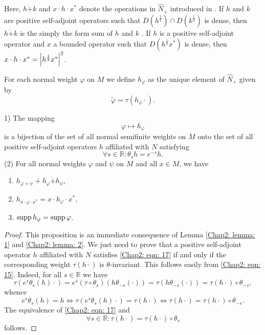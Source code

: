 Here, $h\dot{+}k$ and $x\cdot h\cdot x^*$ denote the operations in $\hat{N}_+$ introduced in \cite[Definition 1.3]{7}. If $h$ and $k$ are positive self-adjoint operators such that $D(h^\frac{1}{2})\cap D(k^\frac{1}{2})$ is dense, then $h\dot{+}k$ is the simply the form sum of $h$ and $k$ \cite[Corollary 4.13]{2}. If $h$ is a positive self-adjoint operator and $x$ a bounded operator such that $D(h^\frac{1}{2}x^*)$ is dense, then $x\cdot h\cdot x^*=\abs{h^\frac{1}{2}x^*}^2$.\par
\begin{definition}
    For each normal weight $\varphi$ on $M$ we define $h_\varphi$ as the unique element of $\hat{N}_+$ given by
    \begin{equation}
        \tilde{\varphi}=\tau(h_\varphi\cdot).
    \end{equation}
\end{definition}
\begin{proposition}\label{Chap2: Prop: 4}
    1) The mapping
    \[
        \varphi\mapsto h_\varphi
    \]
    is a bijection of the set of all normal semifinite weights on $M$ onto the set of all positive self-adjoint operators $h$ affiliated with $N$ satisfying
    \begin{equation}\label{Chap2: eqn: 17}
        \forall s\in \mathbb{R}:\theta_sh=e^{-s}h.
    \end{equation}
    (2) For all normal weights $\varphi$ and $\psi$ on $M$ and all $x\in M$, we have
    \begin{enumerate}
        \item $h_{\varphi+\psi}+h_\varphi\dot{+}h_\psi$,
        \item $h_{x\cdot \varphi \cdot x^*}=x\cdot h_\varphi\cdot x^*$,
        \item $\operatorname{supp} h_\varphi=\operatorname{supp}\varphi$.
    \end{enumerate}
\end{proposition}
\begin{proof}
    This proposition is an immediate consequence of Lemma \ref{Chap2: lemma: 1} and \ref{Chap2: lemma: 2}. We just need to prove that a positive self-adjoint operator $h$ affiliated with $N$ satisfies \eqref{Chap2: eqn: 17} if and only if the corresponding weight $\tau(h\cdot)$ is $\theta$-invariant. This follows easily from \eqref{Chap2: eqn: 15}. Indeed, for all $s\in \mathbb{R}$ we have
    \[
        \tau(e^s\theta_s(h)\cdot)=e^s(\tau\circ \theta_s)(h\theta_{-s}(\cdot))=\tau(h\theta_{-s}(\cdot))=\tau(h\cdot )\circ \theta_{-s},
    \]
    whence
    \[
        e^s\theta_s(h)=h\Leftrightarrow \tau(e^s\theta_s(h)\cdot)=\tau(h\cdot)\Leftrightarrow \tau(h\cdot)=\tau(h\cdot)\circ \theta_{-s}.
    \]
    The equivalence of \eqref{Chap2: eqn: 17} and
    \[
        \forall s\in \mathbb{R}:\tau(h\cdot)=\tau(h\cdot)\circ \theta_s
    \]
    follows.
\end{proof}
